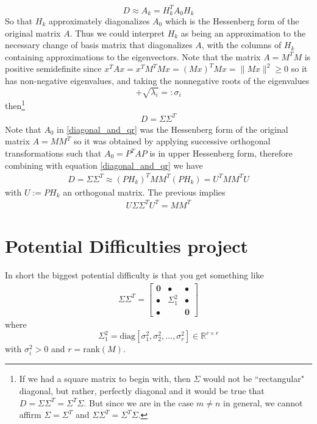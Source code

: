\documentclass[11.5pt]{article}
\theoremstyle{definition}
\begin{document}
\begin{equation}\label{diagonal_and_qr}
D\approx A_k= H_k^T A_0 H_k
\end{equation}
 So that $H_k$ approximately diagonalizes $A_0$ which is the Hessenberg form of the original matrix $A$. Thus we could interpret $H_k$ as being an approximation to the necessary change of basis matrix that diagonalizes $A$, with the columns of $H_k$ containing approximations to the eigenvectors. Note that the matrix $A=M^TM$ is positive semidefinite since $x^TAx=x^TM^TMx=(Mx)^TMx=\|Mx\|^2\geq 0$ so it has non-negative eigenvalues, and taking the nonnegative roots of the eigenvalues $$+\sqrt{\lambda_i}=:\sigma_i$$ then\footnote{If we had a square matrix to begin with, then $\Sigma$ would not be ``rectangular" diagonal, but rather, perfectly diagonal and it would be true that $D=\Sigma \Sigma^T=\Sigma^T \Sigma$. But since we are in the case $m\neq n$ in general, we cannot affirm $\Sigma=\Sigma^T$ and $\Sigma \Sigma^T=\Sigma^T \Sigma$. }
 \begin{align*}
D=\Sigma \Sigma^T
 \end{align*}
Note that $A_0$ in \eqref{diagonal_and_qr} was the Hessenberg form of the original matrix $A=MM^T$ so it was obtained by applying successive orthogonal transformations such that $A_0=P^TAP$ is in upper Hessenberg form, therefore combining with equation \eqref{diagonal_and_qr} we have
\begin{align}\label{defining_U}
D=\Sigma \Sigma^T\approx (PH_k)^T MM^T (PH_k)=U^T MM^T U
\end{align}
with $U:=PH_k$ an orthogonal matrix. The previous implies
\begin{align*}
U\Sigma \Sigma^T U^T=MM^T
\end{align*} 


\section{Potential Difficulties project}
In short the biggest potential difficulty is that you get something like
\begin{align*}
\Sigma\Sigma^T=\begin{bmatrix}
\mathbf{0} & • & • \\ 
• & \Sigma_1^2 & • \\ 
• &  & \mathbf{0}
\end{bmatrix} 
\end{align*}
where
\begin{equation}
\Sigma_1^2=\text{diag}[\sigma_1^2, \sigma_2^2,...,\sigma_r^2]\in\mathbb{R}^{r\times r}
\end{equation}
with $\sigma_i^2>0$ and $r=$rank$(M)$.
\end{document}
